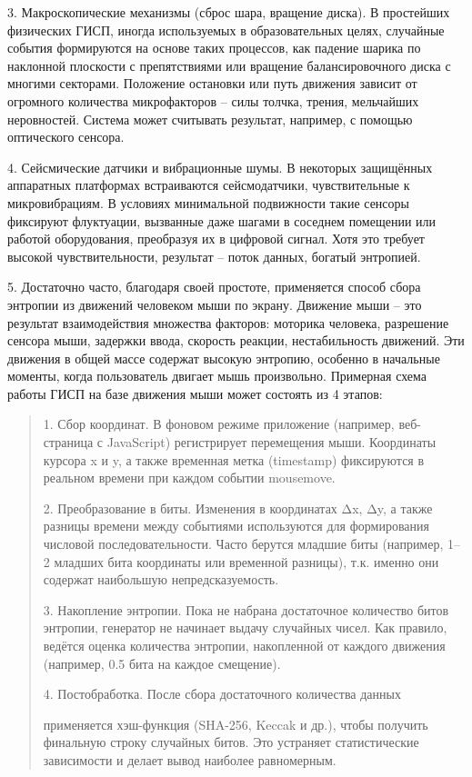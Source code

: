 3. Макроскопические механизмы (сброс шара, вращение диска). В простейших
физических ГИСП, иногда используемых в образовательных целях, случайные
события формируются на основе таких процессов, как падение шарика по
наклонной плоскости с препятствиями или вращение балансировочного диска
с многими секторами. Положение остановки или путь движения зависит от
огромного количества микрофакторов -- силы толчка, трения, мельчайших
неровностей. Система может считывать результат, например, с помощью
оптического сенсора.

4. Сейсмические датчики и вибрационные шумы. В некоторых защищённых
аппаратных платформах встраиваются сейсмодатчики, чувствительные к
микровибрациям. В условиях минимальной подвижности такие сенсоры
фиксируют флуктуации, вызванные даже шагами в соседнем помещении или
работой оборудования, преобразуя их в цифровой сигнал. Хотя это требует
высокой чувствительности, результат -- поток данных, богатый энтропией.

5. Достаточно часто, благодаря своей простоте, применяется способ сбора
энтропии из движений человеком мыши по экрану. Движение мыши -- это
результат взаимодействия множества факторов: моторика человека,
разрешение сенсора мыши, задержки ввода, скорость реакции,
нестабильность движений. Эти движения в общей массе содержат высокую
энтропию, особенно в начальные моменты, когда пользователь двигает мышь
произвольно. Примерная схема работы ГИСП на базе движения мыши может
состоять из 4 этапов:

\begin{quote}
1. Сбор координат. В фоновом режиме приложение (например, веб-страница с
JavaScript) регистрирует перемещения мыши. Координаты курсора x и y, а
также временная метка (timestamp) фиксируются в реальном времени при
каждом событии mousemove.

2. Преобразование в биты. Изменения в координатах Δx, Δy, а также
разницы времени между событиями используются для формирования числовой
последовательности. Часто берутся младшие биты (например, 1--2 младших
бита координаты или временной разницы), т.к. именно они содержат
наибольшую непредсказуемость.

3. Накопление энтропии. Пока не набрана достаточное количество битов
энтропии, генератор не начинает выдачу случайных чисел. Как правило,
ведётся оценка количества энтропии, накопленной от каждого движения
(например, 0.5 бита на каждое смещение).

4. Постобработка. После сбора достаточного количества данных

применяется хэш-функция (SHA-256, Keccak и др.), чтобы получить
финальную строку случайных битов. Это устраняет статистические
зависимости и делает вывод наиболее равномерным.
\end{quote}

